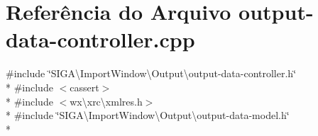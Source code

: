 \section{Referência do Arquivo output-\/data-\/controller.cpp}
\label{output-data-controller_8cpp}
{\ttfamily \#include \char`\"{}S\+I\+G\+A\textbackslash{}\+Import\+Window\textbackslash{}\+Output\textbackslash{}output-\/data-\/controller.\+h\char`\"{}}\\*
{\ttfamily \#include $<$cassert$>$}\\*
{\ttfamily \#include $<$wx\textbackslash{}xrc\textbackslash{}xmlres.\+h$>$}\\*
{\ttfamily \#include \char`\"{}S\+I\+G\+A\textbackslash{}\+Import\+Window\textbackslash{}\+Output\textbackslash{}output-\/data-\/model.\+h\char`\"{}}\\*
